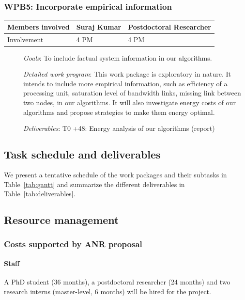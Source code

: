 \documentclass[a4paper,11pt]{article}
\newcommand{\subtask}[1]{{\color{orange}\paragraph{#1}$ $}}
\newcommand{\goal}{{\color{orange2}  \emph{Goals}:} }
\newcommand{\dwp}{{\color{orange2}  \emph{Detailed work program}: }}
\newcommand{\deliverables}{{\color{orange2}  \emph{Deliverables}: }}
\begin{document}
		\subsubsection{\textbf{WPB5}: Incorporate empirical information}
	\begin{table}[H]
		\begin{tabular}{lll}
			\hline
			\cellcolor{blue2}
			Members involved & Suraj Kumar & Postdoctoral Researcher \\
			\hline
			\cellcolor{orange2}
			Involvement      & 4 PM     & 4 PM \\
			\hline
		\end{tabular}
	\end{table}
	\begin{description}
		\item[] \goal To include factual system information in our algorithms.
		\item[] \dwp This work package is exploratory in nature. It intends to include more empirical information, such as efficiency of a processing unit, saturation level of bandwidth links, missing link between two nodes, in our algorithms. It will also investigate energy costs of our algorithms and propose strategies to make them energy optimal.
		\item[] \deliverables\newline
		T0 +48: Energy analysis of our algorithms (report) 
	\end{description}
	
	
	
	\subsection{Task schedule and deliverables}
	\label{sec:org:taskschedule}
	We present a tentative schedule of the work packages and their subtasks in Table~\ref{tab:gantt} and summarize the different deliverables in Table~\ref{tab:deliverables}.
	
	
	
	
	\subsection{Resource management}
	\label{sec:org:costs}
	\subsubsection*{Costs supported by ANR proposal}
	\paragraph{Staff} A PhD student (36 months), a postdoctoral researcher (24 months) and two research interns (master-level, 6 months) will be hired for the project. 
	
\end{document}
